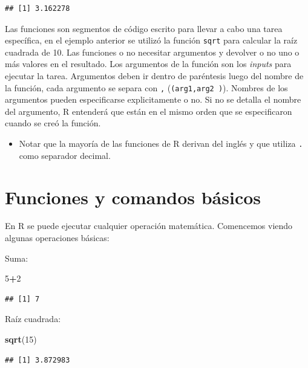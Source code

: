 \documentclass[]{book}
\newenvironment{Shaded}{\begin{snugshade}}{\end{snugshade}}
\newcommand{\KeywordTok}[1]{\textcolor[rgb]{0.13,0.29,0.53}{\textbf{#1}}}
\newcommand{\DecValTok}[1]{\textcolor[rgb]{0.00,0.00,0.81}{#1}}
\newcommand{\OperatorTok}[1]{\textcolor[rgb]{0.81,0.36,0.00}{\textbf{#1}}}
\newcommand{\NormalTok}[1]{#1}
\newenvironment{rmdblock}[1]
{\begin{shaded*}
		\begin{itemize}
			\renewcommand{\labelitemi}{
				\raisebox{-.7\height}[0pt][0pt]{
					{\setkeys{Gin}{width=3em,keepaspectratio}\texttt{[image: images/\#1]}}
				}
			}
			\item
		}
		{
		\end{itemize}
	\end{shaded*}
}
\newenvironment{rmdnote}
{\begin{rmdblock}{note}}
	{\end{rmdblock}}
\begin{document}
\begin{verbatim}
## [1] 3.162278
\end{verbatim}

Las funciones son segmentos de código escrito para llevar a cabo una
tarea específica, en el ejemplo anterior se utilizó la función
\texttt{sqrt} para calcular la raíz cuadrada de 10. Las funciones o no
necesitar argumentos y devolver o no uno o más valores en el resultado.
Los argumentos de la función son los \emph{inputs} para ejecutar la
tarea. Argumentos deben ir dentro de paréntesis luego del nombre de la
función, cada argumento se separa con \texttt{,}
(\texttt{(arg1,arg2\ )}). Nombres de los argumentos pueden especificarse
explicitamente o no. Si no se detalla el nombre del argumento, R
entenderá que están en el mismo orden que se especificaron cuando se
creó la función.

\begin{rmdnote}
Notar que la mayoría de las funciones de R derivan del inglés y que
utiliza \texttt{.} como separador decimal.
\end{rmdnote}

\chapter{Funciones y comandos
básicos}\label{funciones-y-comandos-basicos}

En R se puede ejecutar cualquier operación matemática. Comencemos viendo
algunas operaciones básicas:

Suma:

\begin{Shaded}
\begin{Highlighting}[]
\DecValTok{5}\OperatorTok{+}\DecValTok{2}
\end{Highlighting}
\end{Shaded}

\begin{verbatim}
## [1] 7
\end{verbatim}

Raíz cuadrada:

\begin{Shaded}
\begin{Highlighting}[]
\KeywordTok{sqrt}\NormalTok{(}\DecValTok{15}\NormalTok{)}
\end{Highlighting}
\end{Shaded}

\begin{verbatim}
## [1] 3.872983
\end{verbatim}
\end{document}
